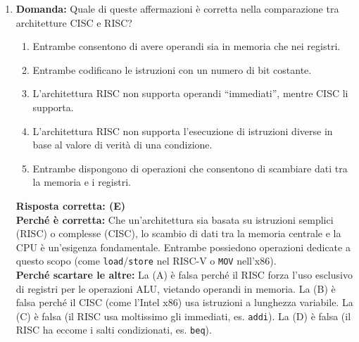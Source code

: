 \documentclass[12pt, a4paper]{article}
\begin{document}
\begin{enumerate}
    \item \textbf{Domanda:} Quale di queste affermazioni è corretta nella comparazione tra architetture CISC e RISC?
    \begin{enumerate}[label=(\Alph*)]
        \item Entrambe consentono di avere operandi sia in memoria che nei registri.
        \item Entrambe codificano le istruzioni con un numero di bit costante.
        \item L'architettura RISC non supporta operandi ``immediati'', mentre CISC li supporta.
        \item L'architettura RISC non supporta l'esecuzione di istruzioni diverse in base al valore di verità di una condizione.
        \item Entrambe dispongono di operazioni che consentono di scambiare dati tra la memoria e i registri.
    \end{enumerate}
    \textbf{Risposta corretta: (E)} \\
    \textbf{Perché è corretta:} Che un'architettura sia basata su istruzioni semplici (RISC) o complesse (CISC), lo scambio di dati tra la memoria centrale e la CPU è un'esigenza fondamentale. Entrambe possiedono operazioni dedicate a questo scopo (come \texttt{load}/\texttt{store} nel RISC-V o \texttt{MOV} nell'x86). \\
    \textbf{Perché scartare le altre:} La (A) è falsa perché il RISC forza l'uso esclusivo di registri per le operazioni ALU, vietando operandi in memoria. La (B) è falsa perché il CISC (come l'Intel x86) usa istruzioni a lunghezza variabile. La (C) è falsa (il RISC usa moltissimo gli immediati, es. \texttt{addi}). La (D) è falsa (il RISC ha eccome i salti condizionati, es. \texttt{beq}).


\end{enumerate}
\end{document}
